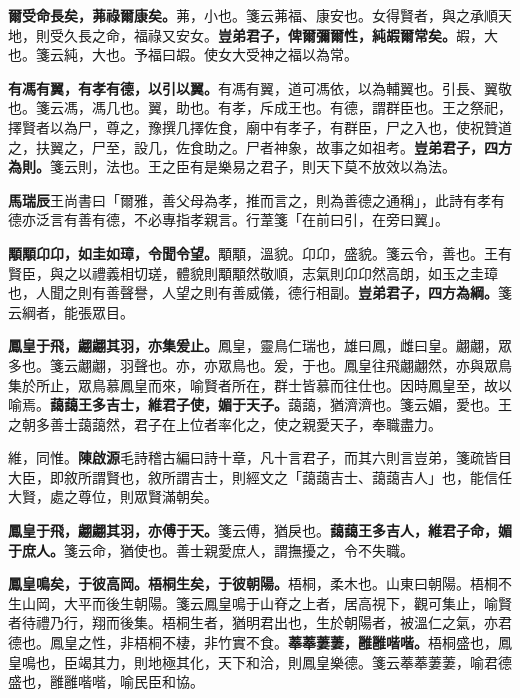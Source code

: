 \textbf{爾受命長矣，茀祿爾康矣。}{\footnotesize 茀，小也。箋云茀福、康安也。女得賢者，與之承順天地，則受久長之命，福祿又安女。}\textbf{豈弟君子，俾爾彌爾性，純嘏爾常矣。}{\footnotesize 嘏，大也。箋云純，大也。予福曰嘏。使女大受神之福以為常。}

\textbf{有馮有翼，有孝有德，以引以翼。}{\footnotesize 有馮有翼，道可馮依，以為輔翼也。引長、翼敬也。箋云馮，馮几也。翼，助也。有孝，斥成王也。有德，謂群臣也。王之祭祀，擇賢者以為尸，尊之，豫撰几擇佐食，廟中有孝子，有群臣，尸之入也，使祝贊道之，扶翼之，尸至，設几，佐食助之。尸者神象，故事之如祖考。}\textbf{豈弟君子，四方為則。}{\footnotesize 箋云則，法也。王之臣有是樂易之君子，則天下莫不放效以為法。}

\begin{quoting}\textbf{馬瑞辰}王尚書曰「爾雅，善父母為孝，推而言之，則為善德之通稱」，此詩有孝有德亦泛言有善有德，不必專指孝親言。行葦箋「在前曰引，在旁曰翼」。\end{quoting}

\textbf{顒顒卬卬，如圭如璋，令聞令望。}{\footnotesize 顒顒，溫貌。卬卬，盛貌。箋云令，善也。王有賢臣，與之以禮義相切瑳，體貌則顒顒然敬順，志氣則卬卬然高朗，如玉之圭璋也，人聞之則有善聲譽，人望之則有善威儀，德行相副。}\textbf{豈弟君子，四方為綱。}{\footnotesize 箋云綱者，能張眾目。}

\textbf{鳳皇于飛，翽翽其羽，亦集爰止。}{\footnotesize 鳳皇，靈鳥仁瑞也，雄曰鳳，雌曰皇。翽翽，眾多也。箋云翽翽，羽聲也。亦，亦眾鳥也。爰，于也。鳳皇往飛翽翽然，亦與眾鳥集於所止，眾鳥慕鳳皇而來，喻賢者所在，群士皆慕而往仕也。因時鳳皇至，故以喻焉。}\textbf{藹藹王多吉士，維君子使，媚于天子。}{\footnotesize 藹藹，猶濟濟也。箋云媚，愛也。王之朝多善士藹藹然，君子在上位者率化之，使之親愛天子，奉職盡力。}

\begin{quoting}維，同惟。\textbf{陳啟源}毛詩稽古編曰詩十章，凡十言君子，而其六則言豈弟，箋疏皆目大臣，即敘所謂賢也，敘所謂吉士，則經文之「藹藹吉士、藹藹吉人」也，能信任大賢，處之尊位，則眾賢滿朝矣。\end{quoting}

\textbf{鳳皇于飛，翽翽其羽，亦傅于天。}{\footnotesize 箋云傅，猶戾也。}\textbf{藹藹王多吉人，維君子命，媚于庶人。}{\footnotesize 箋云命，猶使也。善士親愛庶人，謂撫擾之，令不失職。}

\textbf{鳳皇鳴矣，于彼高岡。梧桐生矣，于彼朝陽。}{\footnotesize 梧桐，柔木也。山東曰朝陽。梧桐不生山岡，大平而後生朝陽。箋云鳳皇鳴于山脊之上者，居高視下，觀可集止，喻賢者待禮乃行，翔而後集。梧桐生者，猶明君出也，生於朝陽者，被溫仁之氣，亦君德也。鳳皇之性，非梧桐不棲，非竹實不食。}\textbf{菶菶萋萋，雝雝喈喈。}{\footnotesize 梧桐盛也，鳳皇鳴也，臣竭其力，則地極其化，天下和洽，則鳳皇樂德。箋云菶菶萋萋，喻君德盛也，雝雝喈喈，喻民臣和協。}

